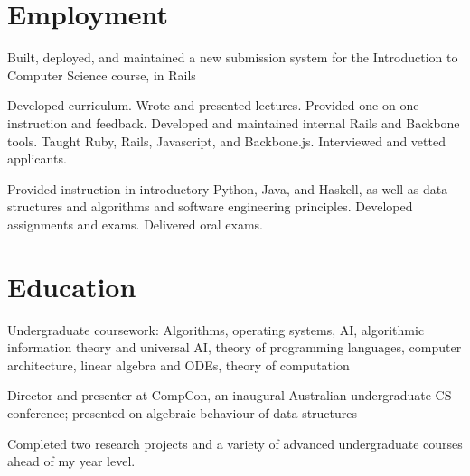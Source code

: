 \documentclass[letterpaper]{resume}
\begin{document}
\author{Buck Shlegeris}
\maketitle

\section{Employment}

\begin{compactitem}
\item Built, deployed, and maintained a new submission system for the Introduction to Computer Science course, in Rails
\end{compactitem}


\begin{compactitem}
\item Developed curriculum. Wrote and presented lectures. Provided one-on-one instruction and feedback. Developed and maintained internal Rails and Backbone tools. Taught Ruby, Rails, Javascript, and Backbone.js. Interviewed and vetted applicants.

\end{compactitem}


\begin{compactitem}
\item Provided instruction in introductory Python, Java, and Haskell, as well as data structures and algorithms and software engineering principles. Developed assignments and exams. Delivered oral exams.
\end{compactitem}


\section{Education}


\begin{compactitem}
\item Undergraduate coursework: Algorithms, operating systems, AI, algorithmic information theory and universal AI, theory of programming languages, computer architecture, linear algebra and ODEs, theory of computation
\item Director and presenter at CompCon, an inaugural Australian undergraduate CS conference; presented on algebraic behaviour of data structures
\item Completed two research projects and a variety of advanced undergraduate courses ahead of my year level.
\end{compactitem}
\end{document}
